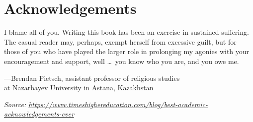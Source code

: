\chapter{Acknowledgements}


I blame all of you. Writing this book has been an exercise in sustained suffering. The casual reader may, perhaps, exempt herself from excessive guilt, but for those of you who have played the larger role in prolonging my agonies with your encouragement and support, well \dots\ you know who you are, and you owe me.%

\RaggedLeft
---Brendan Pietsch, assistant professor of religious studies \\
at Nazarbayev University in Astana, Kazakhstan

\bigskip

\textit{Source: \url{https://www.timeshighereducation.com/blog/best-academic-acknowledgements-ever}}

\justifying